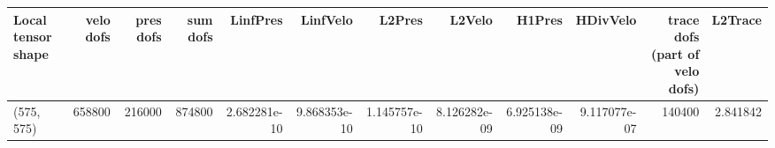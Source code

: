 \begin{tabular}{lrrrrrrrrrrr}
\toprule
Local tensor shape &  velo dofs &  pres dofs &  sum dofs &     LinfPres &     LinfVelo &       L2Pres &       L2Velo &       H1Pres &     HDivVelo &  trace dofs (part of velo dofs) &  L2Trace \\
\midrule
        (575, 575) &     658800 &     216000 &    874800 & 2.682281e-10 & 9.868353e-10 & 1.145757e-10 & 8.126282e-09 & 6.925138e-09 & 9.117077e-07 &                          140400 & 2.841842 \\
\bottomrule
\end{tabular}
